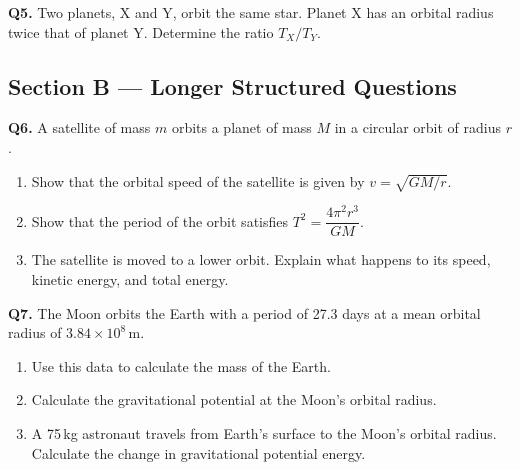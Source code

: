 \bigskip
\noindent\begin{minipage}{\textwidth}
\textbf{Q5.} Two planets, X and Y, orbit the same star. Planet X has an orbital
radius twice that of planet Y. Determine the ratio $T_X/T_Y$.

\answerbox{4cm}
\end{minipage}

\subsection*{Section B — Longer Structured Questions}

\noindent\begin{minipage}{\textwidth}
\textbf{Q6.} A satellite of mass $m$ orbits a planet of mass $M$ in a circular orbit
of radius $r$.

\begin{enumerate}[label=(\alph*)]
  \item Show that the orbital speed of the satellite is given by
        $v = \sqrt{GM/r}$.

        \answerbox{3.5cm}

  \item Show that the period of the orbit satisfies
        $T^2 = \dfrac{4\pi^2 r^3}{GM}$.

        \answerbox{3.5cm}

  \item The satellite is moved to a lower orbit. Explain what happens to its
        speed, kinetic energy, and total energy.

        \answerbox{4cm}
\end{enumerate}
\end{minipage}

\bigskip
\noindent\begin{minipage}{\textwidth}
\textbf{Q7.} The Moon orbits the Earth with a period of 27.3 days at a mean orbital
radius of $3.84\times10^8\,\mathrm{m}$.

\begin{enumerate}[label=(\alph*)]
  \item Use this data to calculate the mass of the Earth.

        \answerbox{4cm}

  \item Calculate the gravitational potential at the Moon's orbital radius.

        \answerbox{3cm}

  \item A 75\,kg astronaut travels from Earth's surface to the Moon's orbital
        radius. Calculate the change in gravitational potential energy.

        \answerbox{4cm}
\end{enumerate}
\end{minipage}

